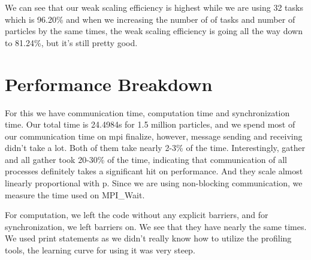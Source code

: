 \documentclass{article}
\begin{document}
We can see that our weak scaling efficiency is highest while we are using 32 tasks which is 96.20\% and when we increasing the number of of tasks and number of particles by the same times, the weak scaling efficiency is going all the way down to 81.24\%, but it's still pretty good.


\section{Performance Breakdown}
For this we have communication time, computation time and synchronization time. Our total time is 24.4984s for 1.5 million particles, and we spend most of our communication time on mpi finalize, however, message sending and receiving didn't take a lot. Both of them take nearly 2-3\% of the time. Interestingly, gather and all gather took 20-30\% of the time, indicating that communication of all processes definitely takes a significant hit on performance. And they scale almost linearly proportional with p. Since we are using non-blocking communication, we measure the time used on MPI_Wait.

For computation, we left the code without any explicit barriers, and for synchronization, we left barriers on. We see that they have nearly the same times. We used print statements as we didn't really know how to utilize the profiling tools, the learning curve for using it was very steep.















\end{document}
